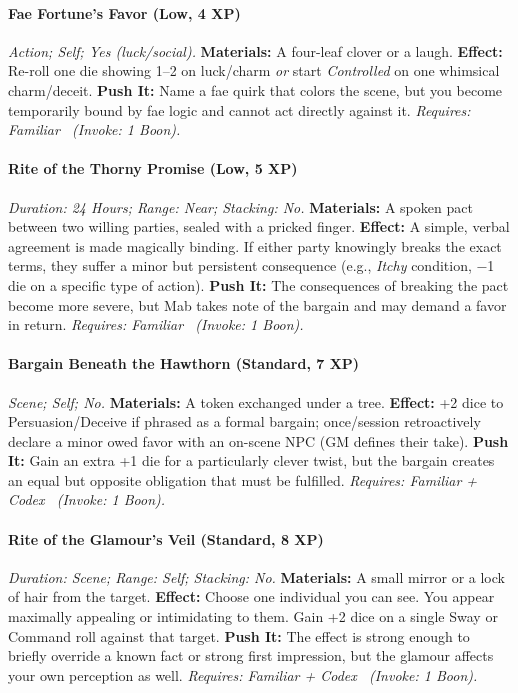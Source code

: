 \paragraph{Fae Fortune's Favor (Low, 4 XP)} \emph{Action; Self; Yes (luck/social).}
\textbf{Materials:} A four-leaf clover or a laugh.
\textbf{Effect:} Re-roll one die showing 1–2 on luck/charm \emph{or} start \emph{Controlled} on one whimsical charm/deceit.
\textbf{Push It:} Name a fae quirk that colors the scene, but you become temporarily bound by fae logic and cannot act directly against it.
\emph{Requires: Familiar \ (\textit{Invoke:} 1 Boon).}
\paragraph{Rite of the Thorny Promise (Low, 5 XP)} \emph{Duration: 24 Hours; Range: Near; Stacking: No.}
\textbf{Materials:} A spoken pact between two willing parties, sealed with a pricked finger.
\textbf{Effect:} A simple, verbal agreement is made magically binding. If either party knowingly breaks the exact terms, they suffer a minor but persistent consequence (e.g., \emph{Itchy} condition, −1 die on a specific type of action).
\textbf{Push It:} The consequences of breaking the pact become more severe, but Mab takes note of the bargain and may demand a favor in return.
\emph{Requires: Familiar \ (\textit{Invoke:} 1 Boon).}
\paragraph{Bargain Beneath the Hawthorn (Standard, 7 XP)} \emph{Scene; Self; No.}
\textbf{Materials:} A token exchanged under a tree.
\textbf{Effect:} +2 dice to Persuasion/Deceive if phrased as a formal bargain; once/session retroactively declare a minor owed favor with an on-scene NPC (GM defines their take).
\textbf{Push It:} Gain an extra +1 die for a particularly clever twist, but the bargain creates an equal but opposite obligation that must be fulfilled.
\emph{Requires: Familiar + Codex \ (\textit{Invoke:} 1 Boon).}
\paragraph{Rite of the Glamour's Veil (Standard, 8 XP)} \emph{Duration: Scene; Range: Self; Stacking: No.}
\textbf{Materials:} A small mirror or a lock of hair from the target.
\textbf{Effect:} Choose one individual you can see. You appear maximally appealing or intimidating to them. Gain +2 dice on a single Sway or Command roll against that target.
\textbf{Push It:} The effect is strong enough to briefly override a known fact or strong first impression, but the glamour affects your own perception as well.
\emph{Requires: Familiar + Codex \ (\textit{Invoke:} 1 Boon).}
